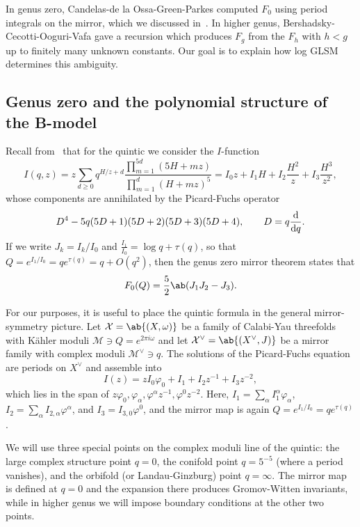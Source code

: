 \documentclass{amsart}
\theoremstyle{definition}
\theoremstyle{remark}
\theoremstyle{plain}
\theoremstyle{definition}
\theoremstyle{remark}
\newcommand{\mc}[1]{\mathcal{#1}}
\newcommand{\1}{\mathbf{1}}
\newcommand{\2}{\mathbf{2}}
\newcommand{\3}{\mathbf{3}}
\begin{document}
In genus zero, Candelas-de la Ossa-Green-Parkes computed \(F_0\) using period integrals on the mirror, which we discussed in~. In higher genus, Bershadsky-Cecotti-Ooguri-Vafa gave a recursion which produces \(F_g\) from the \(F_h\) with \(h < g\) up to finitely many unknown constants. Our goal is to explain how log GLSM determines this ambiguity.

\subsection{Genus zero and the polynomial structure of the B-model}%
\label{sub:Genus zero and the polynomial structure of the B-model}

Recall from~ that for the quintic we consider the \(I\)-function
\[
    I(q,z) = z\sum_{d \geq 0} q^{H/z+d} \frac{\prod_{m=1}^{5d}(5H+mz)}{\prod_{m=1}^d (H+mz)^5} = I_0 z + I_1 H + I_2 \frac{H^2}{z} + I_3 \frac{H^3}{z^2},
\]
whose components are annihilated by the Picard-Fuchs operator
\[ D^4 - 5q(5D+1)(5D+2)(5D+3)(5D+4), \qquad D = q \odv{}{q}. \]
If we write \(J_k = I_k/I_0\) and \(\frac{I_1}{I_0} = \log q + \tau(q)\), so that \(Q = e^{I_1/I_0} = qe^{\tau(q)} = q + O(q^2)\), then the genus zero mirror theorem states that
\[ F_0(Q) = \frac{5}{2}\ab(J_1 J_2 - J_3). \]

For our purposes, it is useful to place the quintic formula in the general mirror-symmetry picture. Let \(\mc{X} = \ab\{(X,\omega)\}\) be a family of Calabi-Yau threefolds with Kähler moduli \(\mc{M} \ni Q = e^{2\pi i \omega}\) and let \(\mc{X}^{\vee} = \ab\{(X^{\vee},J)\}\) be a mirror family with complex moduli \(\mc{M}^{\vee} \ni q\). The solutions of the Picard-Fuchs equation are periods on \(X^{\vee}\) and assemble into
\[ I(z) = zI_0\varphi_0 + I_1 + I_2 z^{-1} + I_3 z^{-2}, \]
which lies in the span of \(z\varphi_0, \varphi_{\alpha}, \varphi^{\alpha}z^{-1}, \varphi^0 z^{-2}\). Here, \(I_1 = \sum_{\alpha} I_1^{\alpha}\varphi_{\alpha}\), \(I_2 = \sum_{\alpha} I_{2,\alpha}\varphi^{\alpha}\), and \(I_3 = I_{3,0}\varphi^0\), and the mirror map is again \(Q = e^{I_1/I_0} = qe^{\tau(q)}\).

We will use three special points on the complex moduli line of the quintic: the large complex structure point \(q=0\), the conifold point \(q = 5^{-5}\) (where a period vanishes), and the orbifold (or Landau-Ginzburg) point \(q = \infty\). The mirror map is defined at \(q=0\) and the expansion there produces Gromov-Witten invariants, while in higher genus we will impose boundary conditions at the other two points.
\end{document}
